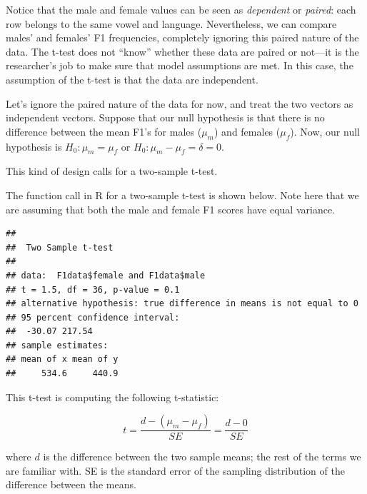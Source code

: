 \documentclass[12pt,]{krantz}
\newenvironment{Shaded}{\begin{snugshade}}{\end{snugshade}}
\newcommand{\DataTypeTok}[1]{\textcolor[rgb]{0.13,0.29,0.53}{#1}}
\newcommand{\KeywordTok}[1]{\textcolor[rgb]{0.13,0.29,0.53}{\textbf{#1}}}
\newcommand{\NormalTok}[1]{#1}
\newcommand{\OperatorTok}[1]{\textcolor[rgb]{0.81,0.36,0.00}{\textbf{#1}}}
\newcommand{\OtherTok}[1]{\textcolor[rgb]{0.56,0.35,0.01}{#1}}
\begin{document}
Notice that the male and female values can be seen as \emph{dependent} or \emph{paired}: each row belongs to the same vowel and language. Nevertheless, we can compare males' and females' F1 frequencies, completely ignoring this paired nature of the data. The t-test does not ``know'' whether these data are paired or not---it is the researcher's job to make sure that model assumptions are met. In this case, the assumption of the t-test is that the data are independent.

Let's ignore the paired nature of the data for now, and treat the two vectors as independent vectors. Suppose that our null hypothesis is that there is no difference between the mean F1's for males (\(\mu_m\)) and females (\(\mu_f\)).
Now, our null hypothesis is \(H_0: \mu_m = \mu_f\) or \(H_0: \mu_m - \mu_f = \delta = 0\).

This kind of design calls for a two-sample t-test.

The function call in R for a two-sample t-test is shown below. Note here that we are assuming that both the male and female F1 scores have equal variance.

\begin{Shaded}
\end{Shaded}

\begin{verbatim}
## 
##  Two Sample t-test
## 
## data:  F1data$female and F1data$male
## t = 1.5, df = 36, p-value = 0.1
## alternative hypothesis: true difference in means is not equal to 0
## 95 percent confidence interval:
##  -30.07 217.54
## sample estimates:
## mean of x mean of y 
##     534.6     440.9
\end{verbatim}

This t-test is computing the following t-statistic:

\begin{equation}
t=\frac{d-(\mu_m - \mu_f)}{SE} = \frac{d-0}{SE} 
\end{equation}

\noindent 
where \(d\) is the difference between the two sample means; the rest of the terms we are familiar with. SE is the standard error of the sampling distribution of the difference between the means.
\end{document}
